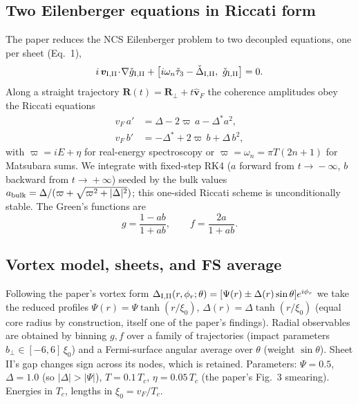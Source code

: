 \documentclass[11pt]{article}
\begin{document}
\subsection{Two Eilenberger equations in Riccati form}
The paper reduces the NCS Eilenberger problem to two decoupled equations, one
per sheet (Eq.~1),
\begin{equation}
i\,\bm v_{\rm I,II}\!\cdot\!\nabla\check g_{\rm I,II}
+\bigl[i\omega_n\check\tau_3-\check\Delta_{\rm I,II},\ \check g_{\rm I,II}\bigr]=0 .
\end{equation}
Along a straight trajectory $\bm R(t)=\bm R_\perp+t\hat{\bm v}_F$ the coherence
amplitudes obey the Riccati equations
\begin{align}
v_F\,a' &= \Delta - 2\varpi\,a - \Delta^{*}a^{2},\\
v_F\,b' &= -\Delta^{*} + 2\varpi\,b + \Delta\,b^{2},
\end{align}
with $\varpi=iE+\eta$ for real-energy spectroscopy or $\varpi=\omega_n=\pi
T(2n+1)$ for Matsubara sums. We integrate with fixed-step RK4 ($a$ forward from
$t\!\to\!-\infty$, $b$ backward from $t\!\to\!+\infty$) seeded by the bulk
values $a_{\rm bulk}=\Delta/(\varpi+\sqrt{\varpi^2+|\Delta|^2})$; this
one-sided Riccati scheme is unconditionally stable. The Green's functions are
\begin{equation}
g=\frac{1-ab}{1+ab},\qquad f=\frac{2a}{1+ab}.
\end{equation}

\subsection{Vortex model, sheets, and FS average}
Following the paper's vortex form
$\Delta_{\rm I,II}(r,\phi_r;\theta)=[\Psi(r)\pm\Delta(r)\sin\theta]e^{i\phi_r}$
we take the reduced profiles $\Psi(r)=\Psi\tanh(r/\xi_0)$,
$\Delta(r)=\Delta\tanh(r/\xi_0)$ (equal core radius by construction, itself one
of the paper's findings). Radial observables are obtained by binning $g,f$ over
a family of trajectories (impact parameters $b_\perp\in[-6,6]\,\xi_0$) and a
Fermi-surface angular average over $\theta$ (weight $\sin\theta$). Sheet II's
gap changes sign across its nodes, which is retained. Parameters:
$\Psi=0.5$, $\Delta=1.0$ (so $|\Delta|>|\Psi|$), $T=0.1\,T_c$,
$\eta=0.05\,T_c$ (the paper's Fig.~3 smearing). Energies in $T_c$, lengths in
$\xi_0=v_F/T_c$.
\end{document}
